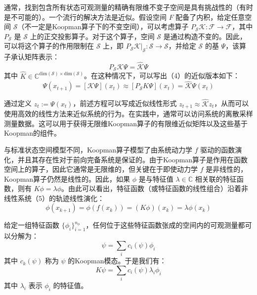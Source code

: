 \documentclass[lang=chs, degree=master, blindreview=false, winfonts=true]{yanputhesis}
\begin{document}
通常，找到包含所有状态可观测量的精确有限维不变子空间是具有挑战性的（有时是不可能的）。一个流行的解决方法是近似。假设空间 \( F \) 配备了内积，给定任意空间 \( \mathcal{S} \)（不一定是Koopman算子下的不变空间），可以考虑算子 \( P_\mathcal{S} \mathcal{K}: \mathcal{F} \to \mathcal{F} \)，其中 \( P_\mathcal{S} \) 是 \( \mathcal{S} \) 上的正交投影算子。对于这个算子，空间 \( \mathcal{S} \) 是通过构造不变的。因此，可以将这个算子的作用限制在 \( \mathcal{S} \) 上，即 \( P_\mathcal{S} \mathcal{K} \rvert_\mathcal{S}: \mathcal{S} \to \mathcal{S} \)，并给定 \( \mathcal{S} \) 的基 \( \Psi \)，该算子承认矩阵表示：
\begin{equation}
	P_\mathcal{S} \mathcal{K}\Psi = \hat{\mathcal{K}}\Psi
	\label{3-7}
\end{equation}
其中 \( \hat{K} \in \mathbb{C}^{\text{dim}(\mathcal{S}) \times \text{dim}(\mathcal{S})} \)。在这种情况下，可以写出（4）的近似版本如下：
\begin{equation}
	\Psi(x_{t+1}) = [\mathcal{K}\Psi](x_t) \approx [P_\mathcal{S} K\Psi](x_t) = \hat{\mathcal{K}}\Psi(x_t)
	\label{3-8}
\end{equation}

通过定义 \( z_t := \Psi(x_t) \)，前述方程可以写成近似线性形式 \( z_{t+1} \approx \hat{\mathcal{K}}z_t \)，从而可以使用高效的线性方法来近似系统的行为。在实践中，通常可以访问系统的离散采样测量数据。这可以用于获得无限维Koopman算子的有限维近似矩阵以及这些基于Koopman的组件。

与标准状态空间模型不同，Koopman算子模型了由系统动力学 \( f \) 驱动的函数演化，并且其存在性对于前向完备系统是保证的。由于Koopman算子是作用在函数空间上的算子，因此它通常是无限维的，但关键在于即使动力学 \( f \) 是非线性的，Koopman算子仍然是线性的。因此，如果 \( \phi \) 是与特征值 \( \lambda \in \mathbb{C} \) 相关联的特征函数，则有 \( K\phi = \lambda\phi \)。由此可以看出，特征函数（或特征函数的线性组合）沿着非线性系统（5）的轨迹线性演化：
\begin{equation}
	\phi(x_{k+1}) = \phi(f(x_k)) = (K\phi)(x_k) = \lambda\phi(x_k)
\end{equation}

给定一组特征函数 \(\{\phi_i\}_{i=1}^{n_\phi}\)，任何位于这些特征函数张成的空间内的可观测量都可以分解为：
\begin{equation}
	\psi = \sum_i c_i(\psi)\phi_i
\end{equation}
其中 \( c_k(\psi) \) 称为 \( \psi \) 的Koopman模态。于是我们有：
\begin{equation}
	K\psi = \sum_i c_i(\psi)\lambda_i\phi_i
\end{equation}
其中 \( \lambda_i \) 表示 \( \phi_i \) 的特征值。
\end{document}
